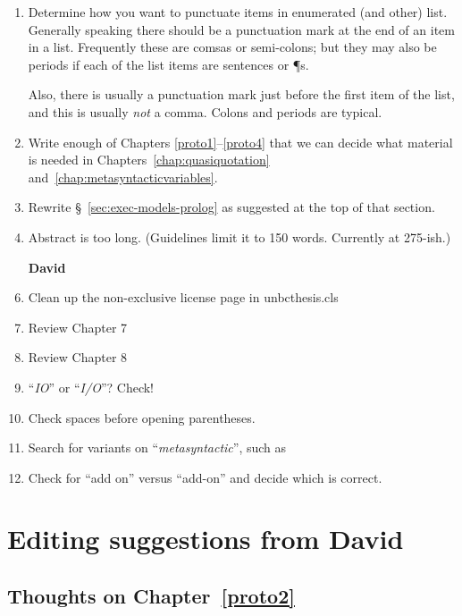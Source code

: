 \begin{scope}
\begin{enumerate}
\begin{enumerate}
\item \label{item:5}
  Determine how you want to punctuate items in enumerated (and other)
  list.
  Generally speaking there should be a punctuation mark at the end of an
  item in a list.
  Frequently these are comsas or semi-colons; but they may also be
  periods if each of the list items are sentences or \P{}s.

  Also, there is usually a punctuation mark just before the first item
  of the list, and this is usually \textit{not} a comma.  Colons and
  periods are typical.

\item
  Write enough of Chapters \ref{proto1}--\ref{proto4} that we can decide
  what material is needed in Chapters~\ref{chap:quasiquotation}
  and~\ref{chap:metasyntacticvariables}.

\item
  Rewrite \S~\ref{sec:exec-models-prolog} as suggested at the top of that section. 

\item
  Abstract is too long.  (Guidelines limit it to 150 words.  Currently
  at 275-ish.)



\item [\textbf{David}]
\item Clean up the non-exclusive license page in unbcthesis.cls
\item Review Chapter 7
\item Review Chapter 8
\item ``\textit{IO}'' or ``\textit{I/O}''?  Check!
\item Check spaces before opening parentheses.
\item Search for variants on ``\textit{metasyntactic}'', such as
\item Check for ``add on'' versus ``add-on'' and decide which is correct.
\end{enumerate}

\section{Editing suggestions from David}\label{sec:edit-sugg-david}

\subsection{Thoughts on Chapter~\ref{proto2}}\label{subsec:thoughts-chapt-proto2}


\end{enumerate}
\end{scope}
